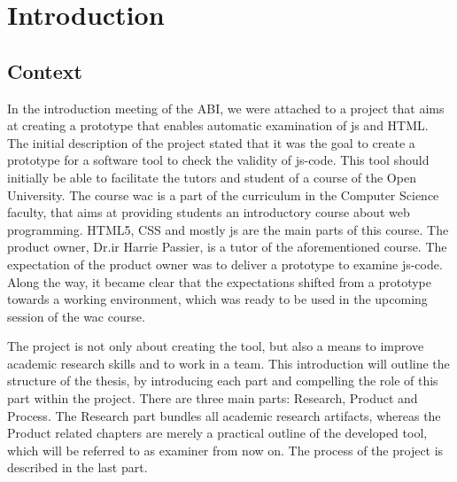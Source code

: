 \chapter{Introduction}



\section{Context} 

In the introduction meeting of the ABI, we were attached to a project that aims 
at creating a prototype that enables automatic
examination of \gls{js} and HTML. The initial description of the project stated 
that it was the goal to create a prototype for a software tool to 
check the validity of \gls{js-code}. This tool should initially be able to
facilitate the tutors and student of a course of the Open University.
The course \gls{wac} is a part of the curriculum in the Computer Science faculty, that aims at providing students an introductory course about web programming.
HTML5, CSS and mostly \gls{js} are the main parts of this course.
The product owner, Dr.ir Harrie Passier, is a tutor of the aforementioned course.
The expectation of the product owner was to deliver a prototype to examine 
\gls{js-code}. Along the way, it became clear that the expectations
shifted from a prototype towards a working environment, which was ready to be used in the upcoming session of the \gls{wac} course.


The project is not only about creating the tool, but also a means to 
improve academic research skills and to work in a team. This introduction will 
outline the structure of the thesis, by introducing each part and compelling the 
role of this part within the project. There are three main parts: Research, 
Product and Process. The Research part bundles all academic research artifacts, 
whereas the Product related chapters are merely a practical outline of the 
developed tool, which will be referred to as \gls{examiner} from now on. The 
process of the project is described in the last part.

